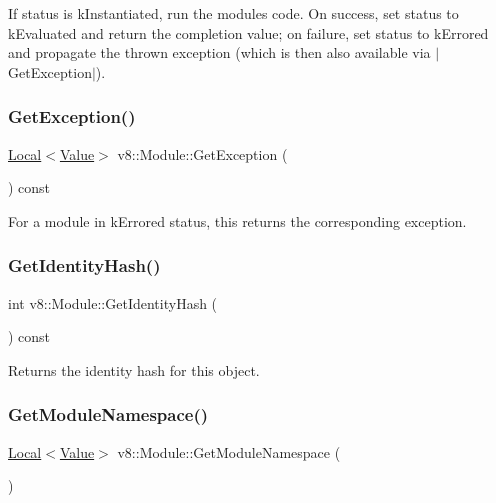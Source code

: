 If status is k\+Instantiated, run the module\textquotesingle{}s code. On success, set status to k\+Evaluated and return the completion value; on failure, set status to k\+Errored and propagate the thrown exception (which is then also available via $\vert$\+Get\+Exception$\vert$). \mbox{\label{classv8_1_1Module_a74ba40e96b4fd457693f11183ecc1dc4}} 
\subsubsection{\texorpdfstring{Get\+Exception()}{GetException()}}
{\footnotesize\ttfamily \mbox{\hyperlink{classv8_1_1Local}{Local}}$<$\mbox{\hyperlink{classv8_1_1Value}{Value}}$>$ v8\+::\+Module\+::\+Get\+Exception (\begin{DoxyParamCaption}{ }\end{DoxyParamCaption}) const}

For a module in k\+Errored status, this returns the corresponding exception. \mbox{\label{classv8_1_1Module_aa2966a54ccb783a91ab494407782e9e3}} 
\subsubsection{\texorpdfstring{Get\+Identity\+Hash()}{GetIdentityHash()}}
{\footnotesize\ttfamily int v8\+::\+Module\+::\+Get\+Identity\+Hash (\begin{DoxyParamCaption}{ }\end{DoxyParamCaption}) const}

Returns the identity hash for this object. \mbox{\label{classv8_1_1Module_a3fd11de1b44b850f3351b2765f32da68}} 
\subsubsection{\texorpdfstring{Get\+Module\+Namespace()}{GetModuleNamespace()}}
{\footnotesize\ttfamily \mbox{\hyperlink{classv8_1_1Local}{Local}}$<$\mbox{\hyperlink{classv8_1_1Value}{Value}}$>$ v8\+::\+Module\+::\+Get\+Module\+Namespace (\begin{DoxyParamCaption}{ }\end{DoxyParamCaption})}

